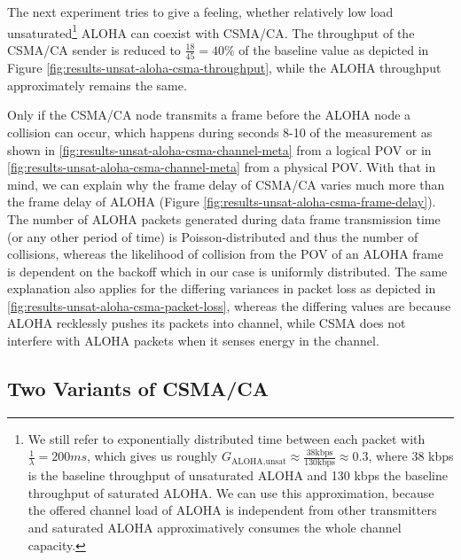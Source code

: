 The next experiment tries to give a feeling, whether relatively low load unsaturated\footnote{We still refer to exponentially distributed time between each packet with $\frac{1}{\lambda}=200ms$, which gives us roughly $G_\text{ALOHA,unsat} \approx \frac{38 \text{kbps}}{130 \text{kbps}}\approx 0.3$, where 38 kbps is the baseline throughput of unsaturated ALOHA and 130 kbps the baseline throughput of saturated ALOHA. We can use this approximation, because the offered channel load of ALOHA is independent from other transmitters and saturated ALOHA approximatively consumes the whole channel capacity.} ALOHA can coexist with CSMA/CA. The throughput of the CSMA/CA sender is reduced to $\frac{18}{45}=40\%$ of the baseline value as depicted in Figure \ref{fig:results-unsat-aloha-csma-throughput}, while the ALOHA throughput approximately remains the same.

Only if the CSMA/CA node transmits a frame before the ALOHA node a collision can occur, which happens during seconds 8-10 of the measurement as shown in \ref{fig:results-unsat-aloha-csma-channel-meta} from a logical POV or in  \ref{fig:results-unsat-aloha-csma-channel-meta} from a physical POV. With that in mind, we can explain why the frame delay of CSMA/CA varies much more than the frame delay of ALOHA (Figure  \ref{fig:results-unsat-aloha-csma-frame-delay}). The number of ALOHA packets generated during data frame transmission time (or any other period of time) is Poisson-distributed and thus the number of collisions, whereas the likelihood of collision from the POV of an ALOHA frame is dependent on the backoff which in our case is uniformly distributed. The same explanation also applies for the differing variances in packet loss as depicted in \ref{fig:results-unsat-aloha-csma-packet-loss}, whereas the differing values are because ALOHA recklessly pushes its packets into channel, while CSMA does not interfere with ALOHA packets when it senses energy in the channel.

\clearpage

\subsection{Two Variants of CSMA/CA}

